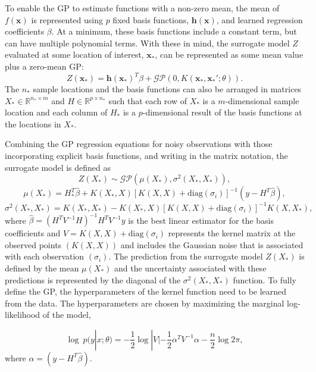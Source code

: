 To enable the GP to estimate functions with a non-zero mean, the mean of $f(\mathbf{x})$ is represented using $p$ fixed basis functions, $\mathbf{h(x)}$, and learned regression coefficients $\beta$. At a minimum, these basis functions include a constant term, but can have multiple polynomial terms. With these in mind, the surrogate model $Z$ evaluated at some location of interest, $\mathbf{x}_*$, can be represented as some mean value plus a zero-mean GP: 
\begin{equation}
    Z(\mathbf{x}_*) = \mathbf{h(\mathbf{x}_*)}^T\beta + \mathcal{GP}(0,K(\mathbf{x}_*,\mathbf{x}_*';\theta)).
\end{equation}
The $n_*$ sample locations and the basis functions can also be arranged in matrices $X_* \in \mathbb{R} ^{ n_* \times m}$ and $H \in \mathbb{R} ^{ p \times n_*}$ such that each row of $X_*$ is a $m$-dimensional sample location and each column of $H_*$ is a $p$-dimensional result of the basis functions at the locations in $X_*$.

Combining the GP regression equations for noisy observations with those incorporating explicit basis functions, and writing in the matrix notation, the surrogate model is defined as 
\begin{equation}
    Z(X_*) \sim \mathcal{GP} (\mu(X_*), \sigma^2(X_*,X_*)),
\end{equation}
\begin{equation} \label{equ:mu_gpr}
    \mu(X_*) = H_*^T\hat{\beta} + K(X_*,X)[K(X,X)+\text{diag}(\sigma_i)]^{-1} (y-H^T\hat{\beta}), 
\end{equation}
\begin{equation} \label{equ:sig_gpr}
    \sigma^2(X_*,X_*) = K(X_*,X_*) - K(X_*,X)[K(X,X)+\text{diag}(\sigma_i)]^{-1} K(X,X_*), 
\end{equation}
where $\hat{\beta} = (H^TV^{-1}H)^{-1}H^TV^{-1}y$ is the best linear estimator for the basis coefficients and $V = K(X,X) + \text{diag}(\sigma_i)$ represents the kernel matrix at the observed points $\left ( K(X,X) \right )$ and includes the Gaussian noise that is associated with each observation $\left ( \sigma_i \right )$. The prediction from the surrogate model $Z(X_*)$ is defined by the mean $\mu(X_*)$ and the uncertainty associated with these predictions is represented by the diagonal of the $\sigma^2(X_*,X_*)$ function. To fully define the GP, the hyperparameters of the kernel function need to be learned from the data. The hyperparameters are chosen by maximizing the marginal log-likelihood of the model, 

\begin{equation}
    \log~p(y|x;\theta) = -\frac{1}{2} \log|V| - \frac{1}{2}\alpha^T V^{-1}\alpha - \frac{n}{2}\log 2\pi,
\end{equation}
where $\alpha = \left ( y-H^T\hat{\beta} \right )$.
